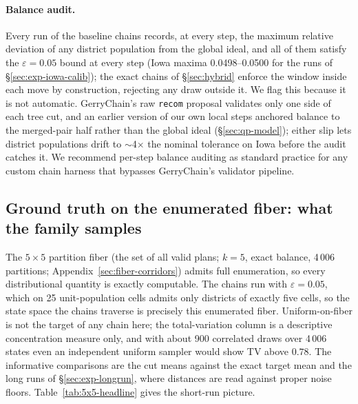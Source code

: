 \documentclass[11pt]{article}
\begin{document}
\paragraph{Balance audit.}\label{sec:exp-balance} Every run of the
baseline chains records, at every step, the maximum relative
deviation of any district population from the global ideal, and all
of them satisfy the $\varepsilon = 0.05$ bound at every step (Iowa
maxima 0.0498--0.0500 for the runs of \S\ref{sec:exp-iowa-calib});
the exact chains of \S\ref{sec:hybrid} enforce the window inside each
move by construction, rejecting any draw outside it. We flag this
because it is not automatic.
GerryChain's raw \texttt{recom} proposal validates only one side of
each tree cut, and an earlier version of our own local steps anchored
balance to the merged-pair half rather than the global ideal
(\S\ref{sec:qp-model}); either slip lets district populations drift
to $\sim$4$\times$ the nominal tolerance on Iowa before the audit
catches it. We recommend per-step balance auditing as standard
practice for any custom chain harness that bypasses GerryChain's
validator pipeline.

\subsection{Ground truth on the enumerated fiber: what the family samples}\label{sec:exp-5x5}

The $5 \times 5$ partition fiber (the set of all valid plans; $k = 5$, exact balance, 4\,006
partitions; Appendix~\ref{sec:fiber-corridors}) admits full enumeration, so
every distributional quantity is exactly computable. The chains run
with $\varepsilon = 0.05$, which on 25 unit-population cells admits
only districts of exactly five cells, so the state space the chains
traverse is precisely this enumerated fiber. Uniform-on-fiber is not the target of any chain here; the
total-variation column is a descriptive concentration measure only,
and with about 900 correlated draws over 4\,006 states even an
independent uniform sampler would show TV above $0.78$. The
informative comparisons are the cut means against the exact target
mean and the long runs of \S\ref{sec:exp-longrun}, where distances
are read against proper noise floors. Table~\ref{tab:5x5-headline}
gives the short-run picture.
\end{document}
